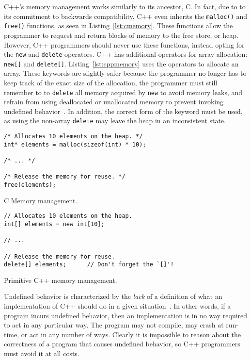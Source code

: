 \documentclass[draftcopy,nolof,nolot]{srpaper}
\begin{document}
C++'s memory management works similarly to its ancestor, C. In fact, due to to
its commitment to backwards compatibility, C++ even inherits the
\texttt{malloc()} and \texttt{free()} functions, as seen in
Listing~\ref{lst:cmemory}. These functions allow the programmer to request and
return blocks of memory to the free store, or heap. However, C++ programmers
should never use these functions, instead opting for the \texttt{new} and
\texttt{delete} operators. C++ has additional operators for array allocation:
\texttt{new[]} and \texttt{delete[]}. Listing~\ref{lst:cppmemory} uses the
operators to allocate an array. These keywords are slightly safer because the
programmer no longer has to keep track of the exact size of the allocation, the
programmer must still remember to to \texttt{delete} all memory acquired by
\texttt{new} to avoid memory leaks, and refrain from using deallocated or
unallocated memory to prevent invoking undefined
behavior~\cite{stroustrup2013the}. In addition, the correct form of the keyword
must be used, as using the non-array \texttt{delete} may leave the heap in an
inconsistent state.

\begin{listing}[H]
\begin{verbatim}
/* Allocates 10 elements on the heap. */
int* elements = malloc(sizeof(int) * 10);

/* ... */

/* Release the memory for reuse. */
free(elements);
\end{verbatim}
\caption{C Memory management.}
\label{lst:cmemory}
\end{listing}

\begin{listing}[H]
\begin{verbatim}
// Allocates 10 elements on the heap.
int[] elements = new int[10];

// ...

// Release the memory for reuse.
delete[] elements;      // Don't forget the `[]'!
\end{verbatim}
\caption{Primitive C++ memory management.}
\label{lst:cppmemory}
\end{listing}

Undefined behavior is
characterized by the \textit{lack} of a definition of what an implementation of
C++ should do in a given situation~\cite{iso/iec}. In other words, if a program
incurs undefined behavior, then an implementation is in no way required to act
in any particular way. The program may not compile, may crash at run-time, or
act in any number of ways. Clearly it is impossible to reason about the
correctness of a program that causes undefined behavior, so C++ programmers
must avoid it at all costs.
\end{document}
